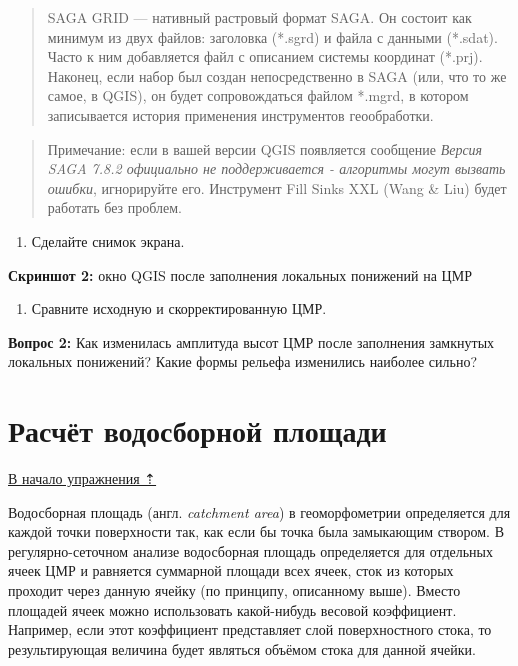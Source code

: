 \documentclass[
  12pt,
]{book}
\providecommand{\tightlist}{%
  \setlength{\itemsep}{0pt}\setlength{\parskip}{0pt}}
\begin{document}
\begin{quote}
SAGA GRID --- нативный растровый формат SAGA. Он состоит как минимум из двух файлов: заголовка (*.sgrd) и файла с данными (*.sdat). Часто к ним добавляется файл с описанием системы координат (*.prj). Наконец, если набор был создан непосредственно в SAGA (или, что то же самое, в QGIS), он будет сопровождаться файлом *.mgrd, в котором записывается история применения инструментов геообработки.
\end{quote}

\begin{quote}
Примечание: если в вашей версии QGIS появляется сообщение \emph{Версия SAGA 7.8.2 официально не поддерживается - алгоритмы могут вызвать ошибки}, игнорируйте его. Инструмент Fill Sinks XXL (Wang \& Liu) будет работать без проблем.
\end{quote}

\begin{enumerate}
\def\labelenumi{\arabic{enumi}.}
\setcounter{enumi}{1}
\tightlist
\item
  Сделайте снимок экрана.
\end{enumerate}

\textbf{Скриншот 2:} окно QGIS после заполнения локальных понижений на ЦМР

\begin{enumerate}
\def\labelenumi{\arabic{enumi}.}
\setcounter{enumi}{2}
\tightlist
\item
  Сравните исходную и скорректированную ЦМР.
\end{enumerate}

\textbf{Вопрос 2:} Как изменилась амплитуда высот ЦМР после заполнения замкнутых локальных понижений? Какие формы рельефа изменились наиболее сильно?

\hypertarget{hydrodem-flowacc}{%
\section{Расчёт водосборной площади}\label{hydrodem-flowacc}}

\protect\hyperlink{hydrodem}{В начало упражнения ⇡}

Водосборная площадь (англ. \emph{catchment area}) в геоморфометрии определяется для каждой точки поверхности так, как если бы точка была замыкающим створом. В регулярно-сеточном анализе водосборная площадь определяется для отдельных ячеек ЦМР и равняется суммарной площади всех ячеек, сток из которых проходит через данную ячейку (по принципу, описанному выше). Вместо площадей ячеек можно использовать какой-нибудь весовой коэффициент. Например, если этот коэффициент представляет слой поверхностного стока, то результирующая величина будет являться объёмом стока для данной ячейки.
\end{document}
